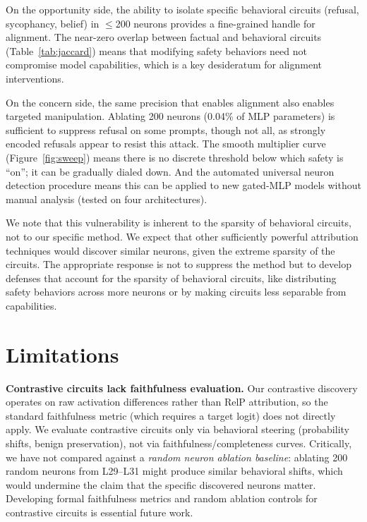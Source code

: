 \documentclass[11pt]{article}
\begin{document}
On the opportunity side, the ability to isolate specific behavioral circuits (refusal, sycophancy, belief) in $\leq$200 neurons provides a fine-grained handle for alignment.
The near-zero overlap between factual and behavioral circuits (Table~\ref{tab:jaccard}) means that modifying safety behaviors need not compromise model capabilities, which is a key desideratum for alignment interventions.

On the concern side, the same precision that enables alignment also enables targeted manipulation.
Ablating 200 neurons (0.04\% of MLP parameters) is sufficient to suppress refusal on some prompts, though not all, as strongly encoded refusals appear to resist this attack.
The smooth multiplier curve (Figure~\ref{fig:sweep}) means there is no discrete threshold below which safety is ``on''; it can be gradually dialed down.
And the automated universal neuron detection procedure means this can be applied to new gated-MLP models without manual analysis (tested on four architectures).

We note that this vulnerability is inherent to the sparsity of behavioral circuits, not to our specific method.
We expect that other sufficiently powerful attribution techniques would discover similar neurons, given the extreme sparsity of the circuits.
The appropriate response is not to suppress the method but to develop defenses that account for the sparsity of behavioral circuits, like distributing safety behaviors across more neurons or by making circuits less separable from capabilities.


\section{Limitations}
\label{sec:limitations}

\textbf{Contrastive circuits lack faithfulness evaluation.}
Our contrastive discovery operates on raw activation differences rather than RelP attribution, so the standard faithfulness metric (which requires a target logit) does not directly apply.
We evaluate contrastive circuits only via behavioral steering (probability shifts, benign preservation), not via faithfulness/completeness curves.
Critically, we have not compared against a \emph{random neuron ablation baseline}: ablating 200 random neurons from L29--L31 might produce similar behavioral shifts, which would undermine the claim that the specific discovered neurons matter.
Developing formal faithfulness metrics and random ablation controls for contrastive circuits is essential future work.
\end{document}
